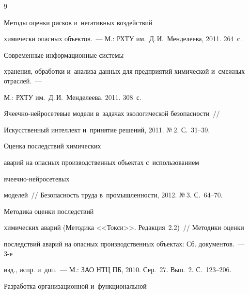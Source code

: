 {\small\frenchspacing


{%




\begin{thebibliography}{9}




   Методы оценки рисков и~негативных воздействий 


химически опасных объектов.~--- М.: РХТУ им.\ Д.\,И.~Менделеева, 2011. 264~с.




   Современные информационные системы 


хранения, обработки и~анализа данных для предприятий химической и~смежных от\-рас\-лей.~--- 


М.: РХТУ им.\ Д.\,И.~Менделеева, 2011. 308~с.






  Яче\-еч\-но-ней\-ро\-се\-те\-вые модели в~задачах экологической безопасности~/\!\!/ 


Искусственный интеллект и~принятие решений, 2011. №\,2. С.~31--39.




   Оценка последствий химических 


аварий на опасных производственных объектах с~использованием 


яче\-еч\-но-ней\-ро\-се\-те\-вых


моделей~/\!\!/ Безопасность труда в~промышленности, 2012. №\,3. С.~64--70.




   Методика оценки последствий 


химических аварий (Методика <<Токси>>. Редакция~2.2)~/\!\!/ Методики оценки 


последствий аварий на опасных производственных объектах: Сб. документов.~--- 3-е 


изд., испр. и~доп.~--- М.: ЗАО НТЦ ПБ, 2010.  Сер.~27. Вып.~2. С.~123--206.




   Разработка организационной и~функциональной 



\end{thebibliography}}}
